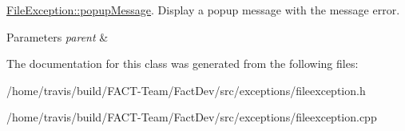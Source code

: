 \hyperlink{classExceptions_1_1FileException_aba824967d55e0a9a29c23521d87f05dd}{File\-Exception\-::popup\-Message}. Display a popup message with the message error. 


\begin{DoxyParams}{Parameters}
{\em parent} & \\
\hline
\end{DoxyParams}


The documentation for this class was generated from the following files\-:\begin{DoxyCompactItemize}
\item 
/home/travis/build/\-F\-A\-C\-T-\/\-Team/\-Fact\-Dev/src/exceptions/fileexception.\-h\item 
/home/travis/build/\-F\-A\-C\-T-\/\-Team/\-Fact\-Dev/src/exceptions/fileexception.\-cpp\end{DoxyCompactItemize}
